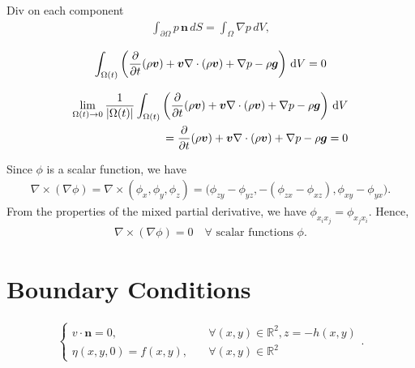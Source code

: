 \documentclass[12pt]{article}
\begin{document}
Div on each component
\begin{align}
    \int_{\partial \Omega} p \, \bm{n} \, d S = \int_{\Omega} \nabla p \, d V,
\end{align}

\begin{align}
    \int_{\Omega(t)} \bigg(\frac{\partial}{\partial t}(\rho \bm{v})
	                + \bm{v} \nabla \cdot (\rho \bm{v}) + \nabla p - \rho \bm{g} \bigg) \, \operatorname{d}\! V = 0
\end{align}

\begin{align}
    \lim_{\Omega(t) \rightarrow 0} \frac{1}{|\Omega(t)|}\int_{\Omega(t)} \bigg(\frac{\partial}{\partial t}(\rho \bm{v})
	                + \bm{v} \nabla \cdot (\rho \bm{v}) + \nabla p - \rho \bm{g} \bigg) \, \operatorname{d}\! V \\
	                = \frac{\partial}{\partial t}(\rho \bm{v})
	                + \bm{v} \nabla \cdot (\rho \bm{v}) + \nabla p - \rho \bm{g} = 0
\end{align}

Since $\phi$ is a scalar function, we have
\begin{align}
    \nabla \times (\nabla \phi) = \nabla \times (\phi_x, \phi_y, \phi_z) =
        \big(\phi_{zy} - \phi_{yz}, -(\phi_{zx} - \phi_{xz}), \phi_{xy} - \phi_{yx} \big).
\end{align}
From the properties of the mixed partial derivative, we have $\phi_{x_i x_j} = \phi_{x_j x_i}$. Hence,
\begin{align}
    \nabla \times (\nabla \phi) = 0 \quad \forall \text{ scalar functions } \phi.
\end{align}

\section{Boundary Conditions}

\begin{align}
	\begin{cases}
	    v\cdot \bm{n} = 0,    &  \quad  \forall (x,y) \in \mathbb{R}^2, z = -h(x,y) \\
	    \eta(x,y,0) = f(x,y), &  \quad  \forall (x,y) \in \mathbb{R}^2
	\end{cases}.
\end{align}
\end{document}
